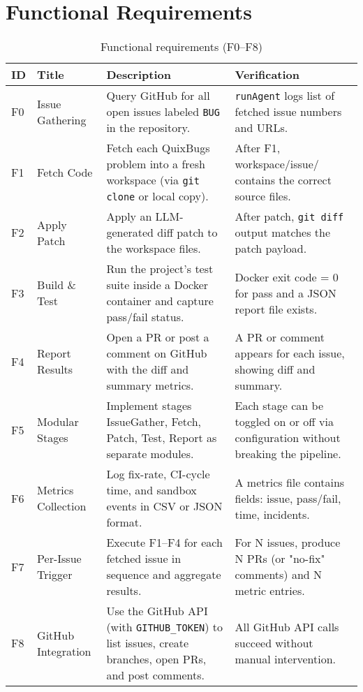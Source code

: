 \section{Functional Requirements}

\begin{table}[ht]
    \centering
    \small
    \begin{tabular*}{\textwidth}{@{\extracolsep{\fill}} p{1cm} p{3cm} p{5cm} p{4cm} @{}}
        \toprule
        \textbf{ID} & \textbf{Title} & \textbf{Description} & \textbf{Verification} \\
        \midrule
        F0 & Issue Gathering
        & Query GitHub for all open issues labeled \texttt{BUG} in the repository.
        & \texttt{runAgent} logs list of fetched issue numbers and URLs. \\[4pt]
        F1 & Fetch Code
        & Fetch each QuixBugs problem into a fresh workspace (via \texttt{git clone} or local copy).
        & After F1, workspace/issue/ contains the correct source files. \\[4pt]
        F2 & Apply Patch
        & Apply an LLM-generated diff patch to the workspace files.
        & After patch, \texttt{git diff} output matches the patch payload. \\[4pt]
        F3 & Build \& Test
        & Run the project's test suite inside a Docker container and capture pass/fail status.
        & Docker exit code = 0 for pass and a JSON report file exists. \\[4pt]
        F4 & Report Results
        & Open a PR or post a comment on GitHub with the diff and summary metrics.
        & A PR or comment appears for each issue, showing diff and summary. \\[4pt]
        F5 & Modular Stages
        & Implement stages IssueGather, Fetch, Patch, Test, Report as separate modules.
        & Each stage can be toggled on or off via configuration without breaking the pipeline. \\[4pt]
        F6 & Metrics Collection
        & Log fix-rate, CI-cycle time, and sandbox events in CSV or JSON format.
        & A metrics file contains fields: issue, pass/fail, time, incidents. \\[4pt]
        F7 & Per-Issue Trigger
        & Execute F1--F4 for each fetched issue in sequence and aggregate results.
        & For N issues, produce N PRs (or "no-fix" comments) and N metric entries. \\[4pt]
        F8 & GitHub Integration
        & Use the GitHub API (with \texttt{GITHUB\_TOKEN}) to list issues, create branches, open PRs, and post comments.
        & All GitHub API calls succeed without manual intervention. \\
        \bottomrule
    \end{tabular*}
    \caption{Functional requirements (F0--F8)}
\end{table}

